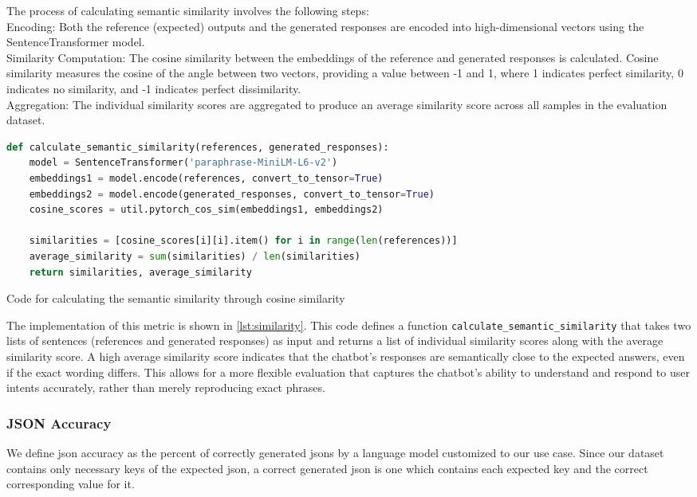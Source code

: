 The process of calculating semantic similarity involves the following steps: \\
Encoding: Both the reference (expected) outputs and the generated responses are encoded into high-dimensional vectors using the SentenceTransformer model.\\
Similarity Computation: The cosine similarity between the embeddings of the reference and generated responses is calculated. Cosine similarity measures the cosine of the angle between two vectors, providing a value between -1 and 1, where 1 indicates perfect similarity, 0 indicates no similarity, and -1 indicates perfect dissimilarity.\\
Aggregation: The individual similarity scores are aggregated to produce an average similarity score across all samples in the evaluation dataset.\\

\begin{Listing}[htb]
    \begin{lstlisting}[language=Python]
def calculate_semantic_similarity(references, generated_responses):
    model = SentenceTransformer('paraphrase-MiniLM-L6-v2')
    embeddings1 = model.encode(references, convert_to_tensor=True)
    embeddings2 = model.encode(generated_responses, convert_to_tensor=True)
    cosine_scores = util.pytorch_cos_sim(embeddings1, embeddings2)

    similarities = [cosine_scores[i][i].item() for i in range(len(references))]
    average_similarity = sum(similarities) / len(similarities)
    return similarities, average_similarity
  \end{lstlisting}
    \caption{Code for calculating the semantic similarity through cosine similarity}
    \label{lst:similarity}
\end{Listing}

The implementation of this metric is shown in \cref{lst:similarity}. This code defines a function \texttt{calculate\_semantic\_similarity} that takes two lists of sentences (references and generated responses) as input and returns a list of individual similarity scores along with the average similarity score.
A high average similarity score indicates that the chatbot's responses are semantically close to the expected answers, even if the exact wording differs. This allows for a more flexible evaluation that captures the chatbot's ability to understand and respond to user intents accurately, rather than merely reproducing exact phrases.


\subsubsection{JSON Accuracy}
We define \gls{json} accuracy as the percent of correctly generated \glspl{json} by a language model customized to our use case.
Since our dataset contains only necessary keys of the expected \gls{json}, a correct generated \gls{json} is one which contains each expected key and the correct corresponding value for it.

